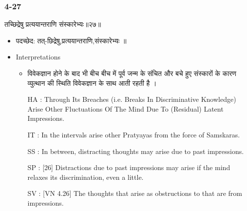 \begin{frame}[fragile]\frametitle{4-27}
\begin{sanskrit}
तच्छिद्रेषु प्रत्ययान्तराणि संस्कारेभ्यः॥२७॥
\end{sanskrit}

	\begin{itemize}
	\item पदच्छेद: तत्-छिद्रेषु,प्रत्ययान्तराणि,संस्कारेभ्यः‌ ॥
	\item Interpretations
		\begin{itemize}	
		\item विवेकज्ञान होने के बाद भी बीच बीच में पूर्व जन्म के संचित और बचे हुए संस्कारों के कारण व्युत्थान की स्थिति विवेकज्ञान के साथ आती रहती है ।
		\item [HA]: Through Its Breaches (i.e. Breaks In Discriminative Knowledge) Arise Other Fluctuations Of The Mind Due To (Residual) Latent Impressions.
		\item [IT]: In the intervals arise other Pratyayas from the force of Samskaras.
		\item [SS]: In between, distracting thoughts may arise due to past impressions.
		\item [SP]: [26] Distractions due to past impressions may arise if the mind relaxes its discrimination, even a little.
		\item [SV]: [VN 4.26] The thoughts that arise as obstructions to that are from impressions. 
		\end{itemize}
	\end{itemize}
\end{frame}



